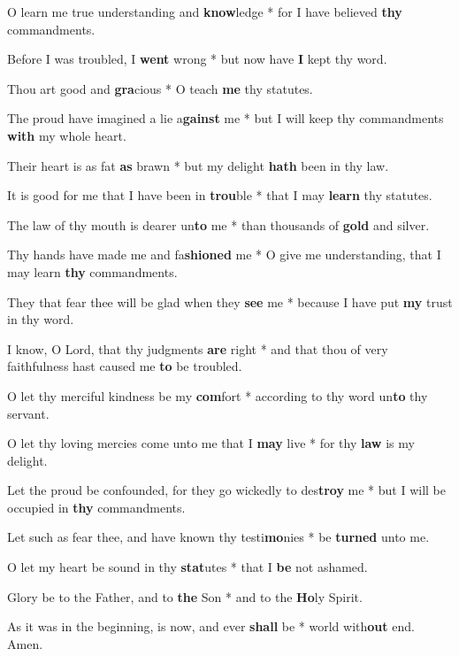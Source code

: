\begin{multicols}{2}
	O learn me true understanding and \textbf{know}ledge * for I have believed \textbf{thy} commandments.
	
	Before I was troubled, I \textbf{went} wrong * but now have \textbf{I} kept thy word.
	
	Thou art good and \textbf{gra}cious * O teach \textbf{me} thy statutes.
	
	The proud have imagined a lie a\textbf{gainst} me * but I will keep thy commandments \textbf{with} my whole heart.
	
	Their heart is as fat \textbf{as} brawn * but my delight \textbf{hath} been in thy law.
	
	It is good for me that I have been in \textbf{trou}ble * that I may \textbf{learn} thy statutes.
	
	The law of thy mouth is dearer un\textbf{to} me * than thousands of \textbf{gold} and silver.
	
	Thy hands have made me and fa\textbf{shioned} me * O give me understanding, that I may learn \textbf{thy} commandments.
	
	They that fear thee will be glad when they \textbf{see} me * because I have put \textbf{my} trust in thy word.
	
	I know, O Lord, that thy judgments \textbf{are} right * and that thou of very faithfulness hast caused me \textbf{to} be troubled.
	
	O let thy merciful kindness be my \textbf{com}fort * according to thy word un\textbf{to} thy servant.
	
	O let thy loving mercies come unto me that I \textbf{may} live * for thy \textbf{law} is my delight.
	
	Let the proud be confounded, for they go wickedly to des\textbf{troy} me * but I will be occupied in \textbf{thy} commandments.
	
	Let such as fear thee, and have known thy testi\textbf{mo}nies * be \textbf{turned} unto me.
	
	O let my heart be sound in thy \textbf{stat}utes * that I \textbf{be} not ashamed.
	
	Glory be to the Father, and to \textbf{the} Son * and to the \textbf{Ho}ly Spirit.
	
	As it was in the beginning, is now, and ever \textbf{shall} be * world with\textbf{out} end. Amen.
\end{multicols}